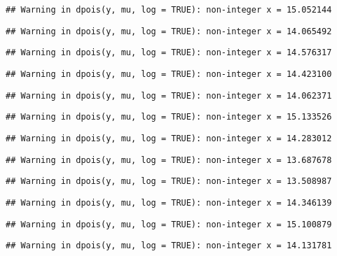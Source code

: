 \documentclass[
]{article}
\begin{document}
\begin{verbatim}
## Warning in dpois(y, mu, log = TRUE): non-integer x = 15.052144
\end{verbatim}

\begin{verbatim}
## Warning in dpois(y, mu, log = TRUE): non-integer x = 14.065492
\end{verbatim}

\begin{verbatim}
## Warning in dpois(y, mu, log = TRUE): non-integer x = 14.576317
\end{verbatim}

\begin{verbatim}
## Warning in dpois(y, mu, log = TRUE): non-integer x = 14.423100
\end{verbatim}

\begin{verbatim}
## Warning in dpois(y, mu, log = TRUE): non-integer x = 14.062371
\end{verbatim}

\begin{verbatim}
## Warning in dpois(y, mu, log = TRUE): non-integer x = 15.133526
\end{verbatim}

\begin{verbatim}
## Warning in dpois(y, mu, log = TRUE): non-integer x = 14.283012
\end{verbatim}

\begin{verbatim}
## Warning in dpois(y, mu, log = TRUE): non-integer x = 13.687678
\end{verbatim}

\begin{verbatim}
## Warning in dpois(y, mu, log = TRUE): non-integer x = 13.508987
\end{verbatim}

\begin{verbatim}
## Warning in dpois(y, mu, log = TRUE): non-integer x = 14.346139
\end{verbatim}

\begin{verbatim}
## Warning in dpois(y, mu, log = TRUE): non-integer x = 15.100879
\end{verbatim}

\begin{verbatim}
## Warning in dpois(y, mu, log = TRUE): non-integer x = 14.131781
\end{verbatim}
\end{document}
